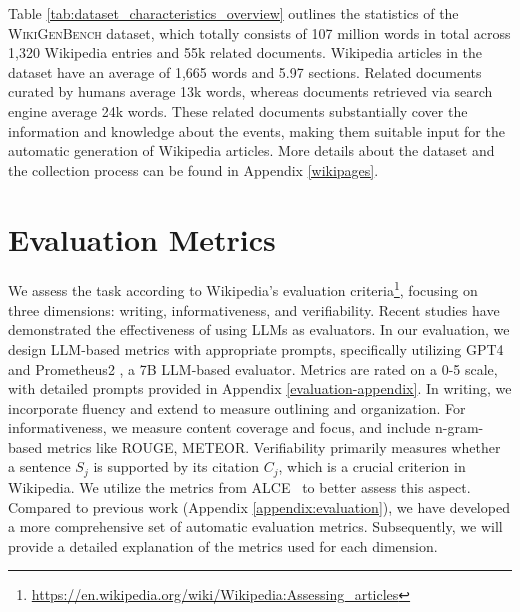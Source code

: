 \documentclass[11pt]{article}
\newcommand{\bench}{\textsc{WikiGenBench}}
\begin{document}
Table \ref{tab:dataset_characteristics_overview} outlines the statistics of the \bench{} dataset, which totally consists of 107 million words in total across 1,320 Wikipedia entries and 55k related documents. Wikipedia articles in the dataset have an average of 1,665 words and 5.97 sections. Related documents curated by humans average 13k words, whereas documents retrieved via search engine average 24k words. 
These related documents substantially cover the information and knowledge about the events, making them suitable input for the automatic generation of Wikipedia articles. 
More details about the dataset and the collection process can be found in Appendix \ref{wikipages}.

\section{Evaluation Metrics}
We assess the task according to Wikipedia's evaluation criteria\footnote{\url{https://en.wikipedia.org/wiki/Wikipedia:Assessing\_articles}}, focusing on three dimensions: writing, informativeness, and verifiability. Recent studies \citep{sottana2023evaluation,chiang-lee-2023-large,lin2023llmeval} have demonstrated the effectiveness of using LLMs as evaluators. In our evaluation, we design LLM-based metrics with appropriate prompts, specifically utilizing GPT4~\cite{achiam2023gpt} and Prometheus2 \cite{kim2024prometheus}, a 7B LLM-based evaluator. Metrics are rated on a 0-5 scale, with detailed prompts provided in Appendix \ref{evaluation-appendix}.
In writing, we incorporate fluency and extend to measure outlining and organization. For informativeness,
we measure content coverage and focus, and include n-gram-based metrics like ROUGE, METEOR. 
Verifiability primarily measures whether a sentence  $S_j$ is supported by its citation  $C_j$, which is a crucial criterion in Wikipedia. We utilize the metrics from ALCE~\cite{gao2023enabling} to better assess this aspect.
Compared to previous work (Appendix \ref{appendix:evaluation}), we have developed a more comprehensive set of automatic evaluation metrics. Subsequently, we will provide a detailed explanation of the metrics used for each dimension.
\end{document}
